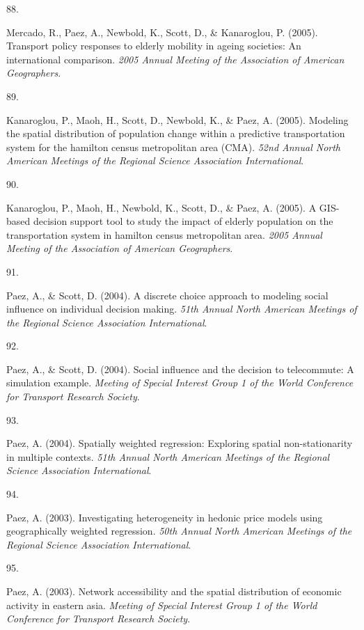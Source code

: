 \documentclass[10pt,a4paper,]{twentysecondcv}
\newlength{\csllabelwidth}
\newcommand{\CSLLeftMargin}[1]{\parbox[t]{\csllabelwidth}{#1}}
\newcommand{\CSLRightInline}[1]{\parbox[t]{\linewidth - \csllabelwidth}{#1}}
\begin{document}
\leavevmode{}%
\CSLLeftMargin{88. }%
\CSLRightInline{Mercado, R., Paez, A., Newbold, K., Scott, D., \&
Kanaroglou, P. (2005). Transport policy responses to elderly mobility in
ageing societies: An international comparison. \emph{2005 Annual Meeting
of the Association of American Geographers}.}

\leavevmode{}%
\CSLLeftMargin{89. }%
\CSLRightInline{Kanaroglou, P., Maoh, H., Scott, D., Newbold, K., \&
Paez, A. (2005). Modeling the spatial distribution of population change
within a predictive transportation system for the hamilton census
metropolitan area (CMA). \emph{52nd Annual North American Meetings of
the Regional Science Association International}.}

\leavevmode{}%
\CSLLeftMargin{90. }%
\CSLRightInline{Kanaroglou, P., Maoh, H., Newbold, K., Scott, D., \&
Paez, A. (2005). A GIS-based decision support tool to study the impact
of elderly population on the transportation system in hamilton census
metropolitan area. \emph{2005 Annual Meeting of the Association of
American Geographers}.}

\leavevmode{}%
\CSLLeftMargin{91. }%
\CSLRightInline{Paez, A., \& Scott, D. (2004). A discrete choice
approach to modeling social influence on individual decision making.
\emph{51th Annual North American Meetings of the Regional Science
Association International}.}

\leavevmode{}%
\CSLLeftMargin{92. }%
\CSLRightInline{Paez, A., \& Scott, D. (2004). Social influence and the
decision to telecommute: A simulation example. \emph{Meeting of Special
Interest Group 1 of the World Conference for Transport Research
Society}.}

\leavevmode{}%
\CSLLeftMargin{93. }%
\CSLRightInline{Paez, A. (2004). Spatially weighted regression:
Exploring spatial non-stationarity in multiple contexts. \emph{51th
Annual North American Meetings of the Regional Science Association
International}.}

\leavevmode{}%
\CSLLeftMargin{94. }%
\CSLRightInline{Paez, A. (2003). Investigating heterogeneity in hedonic
price models using geographically weighted regression. \emph{50th Annual
North American Meetings of the Regional Science Association
International}.}

\leavevmode{}%
\CSLLeftMargin{95. }%
\CSLRightInline{Paez, A. (2003). Network accessibility and the spatial
distribution of economic activity in eastern asia. \emph{Meeting of
Special Interest Group 1 of the World Conference for Transport Research
Society}.}
\end{document}
